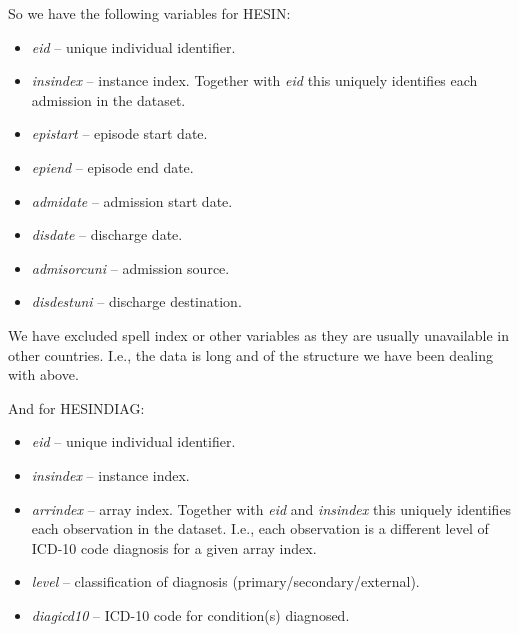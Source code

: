 \documentclass[11pt]{article}
\begin{document}
\color{Blue4}
\begin{stlog}\end{stlog}
\begin{stlog}\end{stlog}
\color{black}

So we have the following variables for HESIN:
\begin{itemize}
\item \emph{eid} -- unique individual identifier.
\item \emph{ins\textunderscore index} -- instance index. Together with \emph{eid} this uniquely identifies each admission in the dataset.
\item \emph{epistart} -- episode start date.
\item \emph{epiend} -- episode end date.
\item \emph{admidate} -- admission start date.
\item \emph{disdate} -- discharge date.
\item \emph{admisorc\textunderscore uni} -- admission source.
\item \emph{disdest\textunderscore uni} -- discharge destination.
\end{itemize}

We have excluded spell index or other variables as they are usually unavailable in other countries. 
I.e., the data is long and of the structure we have been dealing with above. 

\color{Blue4}
\begin{stlog}\end{stlog}
\begin{stlog}\end{stlog}
\color{black}

And for HESIN\textunderscore DIAG: 
\begin{itemize}
\item \emph{eid} -- unique individual identifier.
\item \emph{ins\textunderscore index} -- instance index.
\item \emph{arr\textunderscore index} -- array index. 
Together with \emph{eid} and \emph{ins\textunderscore index} this uniquely identifies each observation in the dataset.
I.e., each observation is a different level of ICD-10 code diagnosis for a given array index. 
\item \emph{level} -- classification of diagnosis (primary/secondary/external).
\item \emph{diag\textunderscore icd10} -- ICD-10 code for condition(s) diagnosed. 
\end{itemize}
\end{document}
